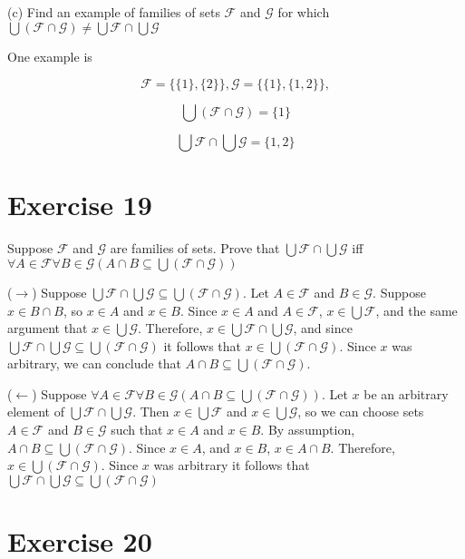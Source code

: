 \documentclass[11pt]{article}
\newcommand{\family}[1]{\mathcal{#1}}
\begin{document}
\noindent (c) Find an example of families of sets $\family{F}$ and $\family{G}$
for which
$\bigcup (\family{F} \cap \family{G}) \neq \bigcup \family{F} \cap \bigcup \family{G}$

One example is 

$$
\family{F} = \{ \{ 1 \}, \{ 2 \} \}, 
\family{G} = \{ \{ 1 \}, \{ 1, 2 \} \}, 
$$

$$\bigcup (\family{F} \cap \family{G}) = \{ 1 \}$$

$$\bigcup \family{F} \cap \bigcup \family{G} = \{ 1, 2 \}$$

\section*{Exercise 19}

Suppose $\family{F}$ and $\family{G}$ are families of sets. 
Prove that 
$\bigcup \family{F} \cap \bigcup \family{G}$
iff
$\forall A \in \family{F} \forall B \in \family{G} (A \cap B \subseteq \bigcup (\family{F} \cap \family{G}))$

($\rightarrow$) Suppose 
$\bigcup \family{F} \cap \bigcup \family{G} \subseteq \bigcup (\family{F} \cap \family{G})$.
Let $A \in \family{F}$ and $B \in \family{G}$. Suppose $x \in B \cap B$, so 
$x \in A$ and $x \in B$. Since $x \in A$ and $A \in \family{F}$, 
$x \in \bigcup \family{F}$, and the same argument that $x \in \bigcup \family{G}$.
Therefore, $x \in \bigcup \family{F} \cap \bigcup \family{G}$, and since 
$\bigcup \family{F} \cap \bigcup \family{G} \subseteq \bigcup (\family{F} \cap \family{G})$
it follows that $x \in \bigcup (\family{F} \cap \family{G})$. Since $x$ was 
arbitrary, we can conclude that $A \cap B \subseteq \bigcup (\family{F} \cap \family{G})$.

($\leftarrow$) Suppose 
$\forall A \in \family{F} \forall B \in \family{G} (A \cap B \subseteq \bigcup (\family{F} \cap \family{G}))$.
Let $x$ be an arbitrary element of $\bigcup \family{F} \cap \bigcup \family{G}$.
Then $x \in \bigcup \family{F}$ and $x \in \bigcup \family{G}$, so we can choose 
sets $A \in \family{F}$ and $B \in \family{G}$ such that $x \in A$ and $x \in B$.
By assumption, $A \cap B \subseteq \bigcup (\family{F} \cap \family{G})$.
Since $x \in A$, and $x \in B$, $x \in A \cap B$. Therefore, 
$x \in \bigcup (\family{F} \cap \family{G})$. Since $x$ was arbitrary it follows
that $\bigcup \family{F} \cap \bigcup \family{G} \subseteq \bigcup (\family{F} \cap \family{G})$

\section*{Exercise 20}
\end{document}
